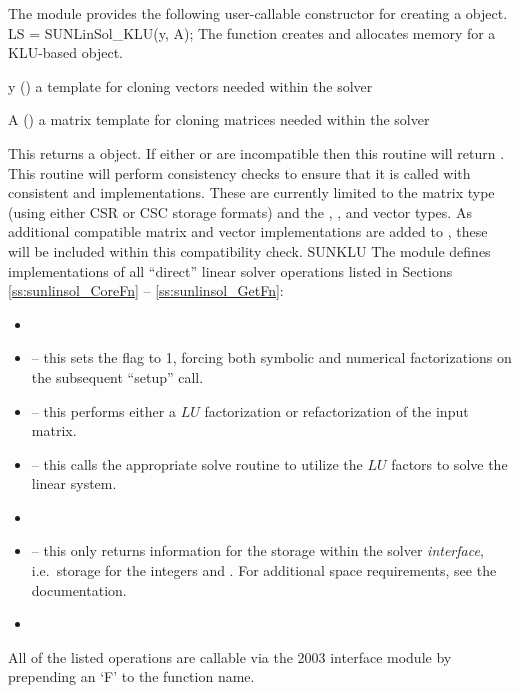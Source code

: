 The {\sunlinsolklu} module provides the following user-callable constructor
for creating a \newline {} object.
%
%
{
  LS = SUNLinSol\_KLU(y, A);
}
{
  The function  creates and allocates memory for
  a KLU-based \newline {} object.
}
{
  \begin{args}[y]
  \item[y] ()
    a template for cloning vectors needed within the solver
  \item[A] ()
    a {\sunmatsparse} matrix template for cloning matrices needed
    within the solver
  \end{args}
}
{
  This returns a  object.  If either  or
   are incompatible then this routine will return .
}
{
  This routine will perform consistency checks to ensure that it is
  called with consistent {\nvector} and {\sunmatrix} implementations.
  These are currently limited to the {\sunmatsparse} matrix type
  (using either CSR or CSC storage formats) and the {\nvecs},
  {\nvecopenmp}, and {\nvecpthreads} vector types.  As additional
  compatible matrix and vector implementations are added to
  {\sundials}, these will be included within this compatibility
  check.
}
{SUNKLU}
%
%
The {\sunlinsolklu} module defines implementations of all
``direct'' linear solver operations listed in Sections
\ref{ss:sunlinsol_CoreFn} -- \ref{ss:sunlinsol_GetFn}:
\begin{itemize}
\item {}
\item {} -- this sets the
   flag to 1, forcing both symbolic and numerical
  factorizations on the subsequent ``setup'' call.
\item {} -- this performs either a $LU$
  factorization or refactorization of the input matrix.
\item {} -- this calls the appropriate {\klu}
  solve routine to utilize the $LU$ factors to solve the linear
  system.
\item {}
\item {} -- this only returns information for
  the storage within the solver \emph{interface}, i.e.~storage for the
  integers  and .  For additional
  space requirements, see the {\klu} documentation.
\item {}
\end{itemize}
All of the listed operations are callable via the {\F} 2003 interface module
by prepending an `F' to the function name.

